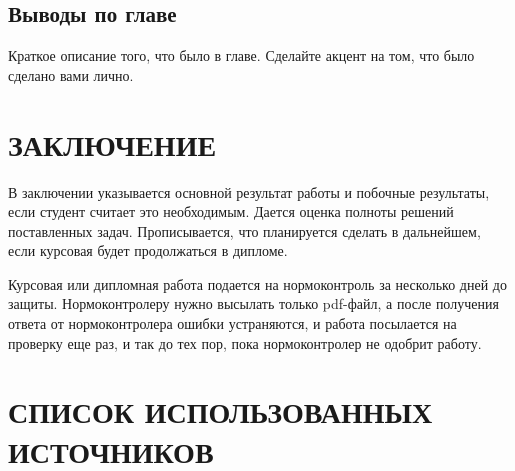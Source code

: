 \documentclass{report}
\begin{document}
\section*{Выводы по главе}
Краткое описание того, что было в главе. Сделайте акцент на том, что было сделано вами лично.

\chapter*{ЗАКЛЮЧЕНИЕ}

В заключении указывается основной результат работы и побочные результаты, если студент считает это необходимым. Дается оценка полноты решений поставленных задач. Прописывается, что планируется сделать в дальнейшем, если курсовая будет продолжаться в дипломе. 

Курсовая или дипломная работа подается на нормоконтроль за нес\-колько дней до защиты. Нормоконтролеру нужно высылать только pdf-файл, а после получения ответа от нормоконтролера ошибки устраняются, и работа посылается на проверку еще раз, и так до тех пор, пока нормоконтролер не одобрит работу.




\chapter*{СПИСОК ИСПОЛЬЗОВАННЫХ ИСТОЧНИКОВ}
\end{document}
